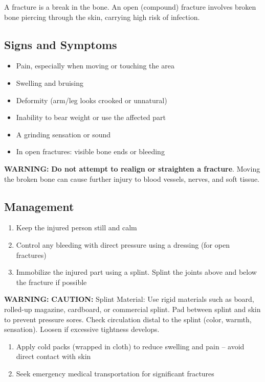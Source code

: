 A fracture is a break in the bone. An open (compound) fracture involves broken bone piercing through the skin, carrying high risk of infection.

\subsection{Signs and Symptoms}

\begin{itemize}[leftmargin=*]
  \item Pain, especially when moving or touching the area
  \item Swelling and bruising
  \item Deformity (arm/leg looks crooked or unnatural)
  \item Inability to bear weight or use the affected part
  \item A grinding sensation or sound
  \item In open fractures: visible bone ends or bleeding
\end{itemize}

\textbf{WARNING:} \textbf{Do not attempt to realign or straighten a fracture}. Moving the broken bone can cause further injury to blood vessels, nerves, and soft tissue.

\subsection{Management}

\begin{enumerate}[leftmargin=*]
\item Keep the injured person still and calm
\item Control any bleeding with direct pressure using a dressing (for open fractures)
\item Immobilize the injured part using a splint. Splint the joints above and below the fracture if possible
\end{enumerate}
\textbf{WARNING:} \textbf{CAUTION:} Splint Material: Use rigid materials such as board, rolled-up magazine, cardboard, or commercial splint. Pad between splint and skin to prevent pressure sores. Check circulation distal to the splint (color, warmth, sensation). Loosen if excessive tightness develops.

\begin{enumerate}[leftmargin=*]
\item Apply cold packs (wrapped in cloth) to reduce swelling and pain -- avoid direct contact with skin
\item Seek emergency medical transportation for significant fractures
\end{enumerate}

